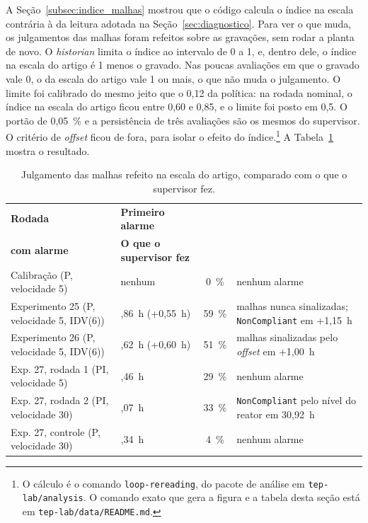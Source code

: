 A Seção~\ref{subsec:indice_malhas} mostrou que o código calcula o índice na escala contrária à da leitura adotada na Seção~\ref{sec:diagnostico}. Para ver o que muda, os julgamentos das malhas foram refeitos sobre as gravações, sem rodar a planta de novo. O \textit{historian} limita o índice ao intervalo de 0 a 1, e, dentro dele, o índice na escala do artigo é 1 menos o gravado. Nas poucas avaliações em que o gravado vale 0, o da escala do artigo vale 1 ou mais, o que não muda o julgamento. O limite foi calibrado do mesmo jeito que o 0,12 da política: na rodada nominal, o índice na escala do artigo ficou entre 0,60 e 0,85, e o limite foi posto em 0,5. O portão de 0,05~\% e a persistência de três avaliações são os mesmos do supervisor. O critério de \textit{offset} ficou de fora, para isolar o efeito do índice.\footnote{O cálculo é o comando \texttt{loop-rereading}, do pacote de análise em \texttt{tep-lab/analysis}. O comando exato que gera a figura e a tabela desta seção está em \texttt{tep-lab/data/README.md}.} A Tabela~\ref{tab:releitura} mostra o resultado.

\begin{table}[htbp]
	\centering
	\caption{Julgamento das malhas refeito na escala do artigo, comparado com o que o supervisor fez.}
	\label{tab:releitura}
	\footnotesize
	\begin{tabular}{|>{\raggedright\arraybackslash}p{}|>{\raggedright\arraybackslash}p{}|c|>{\raggedright\arraybackslash}p{}|}
		\hline
		\textbf{Rodada} & \textbf{Primeiro alarme} & \cabecalho{\textbf{Avaliações}\\\textbf{com alarme}} & \textbf{O que o supervisor fez} \\
		\hline
		Calibração (P, velocidade 5) & nenhum & 0~\% & nenhum alarme \\
		Experimento 25 (P, velocidade 5, IDV(6)) & 2,86~h (+0,55~h) & 59~\% & malhas nunca sinalizadas; \texttt{NonCompliant} em +1,15~h \\
		Experimento 26 (P, velocidade 5, IDV(6)) & 2,62~h (+0,60~h) & 51~\% & malhas sinalizadas pelo \textit{offset} em +1,00~h \\
		Exp. 27, rodada 1 (PI, velocidade 5) & 0,46~h & 29~\% & nenhum alarme \\
		Exp. 27, rodada 2 (PI, velocidade 30) & 2,07~h & 33~\% & \texttt{NonCompliant} pelo nível do reator em 30,92~h \\
		Exp. 27, controle (P, velocidade 30) & 5,34~h & 4~\% & nenhum alarme \\
		\hline
	\end{tabular}
\end{table}

